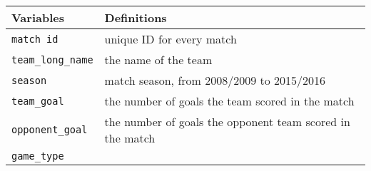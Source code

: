 \documentclass[]{book}
\theoremstyle{definition}
\theoremstyle{definition}
\theoremstyle{definition}
\theoremstyle{remark}
\begin{document}
\begin{longtable}[]{@{}ll@{}}
\toprule
\begin{minipage}[b]{0.43\columnwidth}\raggedright\strut
Variables\strut
\end{minipage} & \begin{minipage}[b]{0.51\columnwidth}\raggedright\strut
Definitions\strut
\end{minipage}\tabularnewline
\midrule
\endhead
\begin{minipage}[t]{0.43\columnwidth}\raggedright\strut
\texttt{match\ id}\strut
\end{minipage} & \begin{minipage}[t]{0.51\columnwidth}\raggedright\strut
unique ID for every match\strut
\end{minipage}\tabularnewline
\begin{minipage}[t]{0.43\columnwidth}\raggedright\strut
\texttt{team\_long\_name}\strut
\end{minipage} & \begin{minipage}[t]{0.51\columnwidth}\raggedright\strut
the name of the team\strut
\end{minipage}\tabularnewline
\begin{minipage}[t]{0.43\columnwidth}\raggedright\strut
\texttt{season}\strut
\end{minipage} & \begin{minipage}[t]{0.51\columnwidth}\raggedright\strut
match season, from 2008/2009 to 2015/2016\strut
\end{minipage}\tabularnewline
\begin{minipage}[t]{0.43\columnwidth}\raggedright\strut
\texttt{team\_goal}\strut
\end{minipage} & \begin{minipage}[t]{0.51\columnwidth}\raggedright\strut
the number of goals the team scored in the match\strut
\end{minipage}\tabularnewline
\begin{minipage}[t]{0.43\columnwidth}\raggedright\strut
\texttt{opponent\_goal}\strut
\end{minipage} & \begin{minipage}[t]{0.51\columnwidth}\raggedright\strut
the number of goals the opponent team scored in the match\strut
\end{minipage}\tabularnewline
\begin{minipage}[t]{0.43\columnwidth}\raggedright\strut
\texttt{game\_type}\strut
\end{minipage} & \begin{minipage}[t]{0.51\columnwidth}\raggedright\strut

\end{minipage}
\end{longtable}
\end{document}
